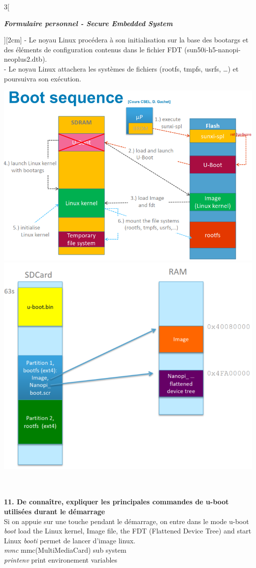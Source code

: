 \begin{multicols}{3}[\centerline{ \large\em \textbf{Formulaire personnel - Secure Embedded System}}][2cm]
- Le noyau Linux procédera à son initialisation sur la base des bootargs et des éléments de configuration contenus dans le fichier FDT (sun50i-h5-nanopi-neoplus2.dtb).\\
- Le noyau Linux attachera les systèmes de fichiers (rootfs, tmpfs, usrfs, …) et poursuivra son exécution.
\begin{minipage}{\linewidth}
	\centering
    \includegraphics[width =0.8\columnwidth]{images/4.png}
    \includegraphics[width =0.6\columnwidth]{images/38.png}
\end{minipage}\\
\\ \textbf{11. De connaître, expliquer les principales commandes de u-boot utilisées durant le démarrage\\}
Si on appuie sur une touche pendant le démarrage, on entre dans le mode u-boot\\
\textit{boot} load the Linux kernel, Image file, the FDT (Flattened Device Tree) and start Linux
\textit{booti} permet de lancer d'image linux.\\
\textit{mmc} mmc(MultiMediaCard) sub system\\
\textit{printenv} print environement variables\\

\end{multicols}
